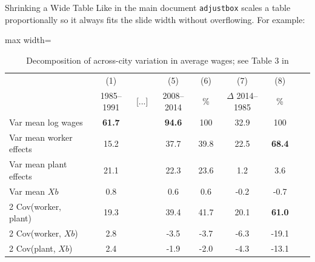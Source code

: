 \begin{frame}{Shrinking a Wide Table}
Like in the main document \texttt{adjustbox} scales a table proportionally so it always fits the slide width without overflowing. For example: 

\vspace{0.3cm}

\begin{table}[t]
\centering
\begin{adjustbox}{max width=\textwidth}
\begin{tabular}{lcccccccc}
\toprule
 & (1) &  & (5) & (6) & (7) & (8) \\
 & 1985--1991 & [...] & 2008--2014 & \% & $\Delta$ 2014--1985 & \% \\
\midrule
Var mean log wages      & \textbf{61.7} &  & \textbf{94.6} & 100 & 32.9 & 100 \\
Var mean worker effects & 15.2 &  & 37.7 & 39.8 & 22.5 & \textbf{68.4} \\
Var mean plant effects  & 21.1 &  & 22.3 & 23.6 &  1.2 &  3.6 \\
Var mean $Xb$           &  0.8 &  &  0.6 &  0.6 & -0.2 & -0.7 \\
2 Cov(worker, plant)    & 19.3 &  & 39.4 & 41.7 & 20.1 & \textbf{61.0} \\
2 Cov(worker, $Xb$)     &  2.8 &  & -3.5 & -3.7 & -6.3 & -19.1 \\
2 Cov(plant, $Xb$)      &  2.4 &  & -1.9 & -2.0 & -4.3 & -13.1 \\
\bottomrule
\end{tabular}
\end{adjustbox}
\caption{Decomposition of across-city variation in average wages; see Table 3 in \citet{dauthMatchingCities2022}}
\label{tab:varDecomp}
\end{table}

\end{frame}